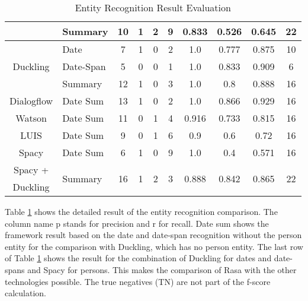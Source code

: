 \begin{table}[h]
\begin{tabular}{ c | l | c | c | c | c | c | c | c | c }
        & Summary & 10 & 1 & 2 & 9 & 0.833 & 0.526 & 0.645 & 22 \\ \hline
        \multirow{3}{*}{Duckling} 
        & Date & 7 & 1 & 0 & 2 & 1.0 & 0.777 & 0.875 & 10 \\ 
        & Date-Span & 5 & 0 & 0 & 1 & 1.0 & 0.833 & 0.909 & 6 \\ \cline{2-10}
        & Summary & 12 & 1 & 0 & 3 & 1.0 & 0.8 & 0.888 & 16 \\ \hline
        Dialogflow & Date Sum & 13 & 1 & 0 & 2 & 1.0 & 0.866 & 0.929 & 16 \\ \hline
        Watson & Date Sum & 11 & 0 & 1 & 4 & 0.916 & 0.733 & 0.815 & 16 \\ \hline
        LUIS & Date Sum & 9 & 0 & 1 & 6 & 0.9 & 0.6 & 0.72 & 16 \\ \hline
        Spacy & Date Sum & 6 & 1 & 0 & 9 & 1.0 & 0.4 & 0.571 & 16 \\ \hline
        Spacy + & \multirow{2}{*}{Summary} & \multirow{2}{*}{16} & \multirow{2}{*}{1} & \multirow{2}{*}{2} & \multirow{2}{*}{3} & \multirow{2}{*}{0.888} & \multirow{2}{*}{0.842} & \multirow{2}{*}{0.865} & \multirow{2}{*}{22} \\
        Duckling & & & & & & & & & \\
    \end{tabular}
    \caption{Entity Recognition Result Evaluation} \label{tab:entity_extraction_eval}
\end{table} \noindent
Table \ref{tab:entity_extraction_eval} shows the detailed result of the entity recognition comparison.
The column name p stands for precision and r for recall.
Date sum shows the framework result based on the date and date-span recognition without the person entity for the comparison with Duckling, which has no person entity.
The last row of Table \ref{tab:entity_extraction_eval} shows the result for the combination of Duckling for dates and date-spans and Spacy for persons.
This makes the comparison of Rasa with the other technologies possible.
The true negatives (TN) are not part of the f-score calculation.

